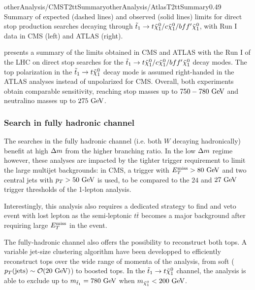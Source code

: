                      {otherAnalysis/CMST2ttSummary}{otherAnalysis/AtlasT2ttSummary}{0.49}
    {Summary of expected (dashed lines) and observed (solid lines) limits for direct stop
    production searches decaying through $\tilde{t}_1 \rightarrow t \tilde{\chi}_1^0 / c \tilde{\chi}_1^0 / b ff' \tilde{\chi}_1^0$,
    with Run I data in CMS (left) and ATLAS (right).}

     presents a summary of the limits obtained in CMS and ATLAS
    with the Run I of the LHC on direct stop searches for the $\tilde{t}_1 \rightarrow t \tilde{\chi}_1^0 / c \tilde{\chi}_1^0 / b ff' \tilde{\chi}_1^0$
    decay modes. The top polarization in the $\tilde{t}_1 \rightarrow t \tilde{\chi}_1^0$ decay mode
    is assumed right-handed in the ATLAS analyses instead of unpolarized for CMS. Overall,
    both experiments obtain comparable sensitivity, reaching stop masses up to $750-780~\text{GeV}$
    and neutralino masses up to $275~\text{GeV}$.

    \subsubsection{Search in fully hadronic channel}

    The searches in the fully hadronic channel (i.e. both $W$ decaying hadronically) \cite{SUS-13-023, ATLASstopSearches}
    benefit at high $\Delta m$ from the higher branching ratio. In the low $\Delta m$ regime however,
    these analyses are impacted by the tighter trigger requirement to limit the large multijet
    backgrounds: in CMS, a trigger with $E_T^\text{miss} > 80~\text{GeV}$ and two central jets with
    $p_T > 50~\text{GeV}$ is used, to be compared to the $24$ and $27~\text{GeV}$ trigger thresholds of
    the 1-lepton analysis.

    Interestingly, this analysis also requires a dedicated strategy to find and veto
    event with lost lepton as the semi-leptonic $t\bar{t}$ becomes a major background
    after requiring large $E_T^\text{miss}$ in the event.

    The fully-hadronic channel also offers the possibility to reconstruct both tops. A
    variable jet-size clustering algorithm have been developped to efficiently reconstruct
    tops over the wide range of momenta of the analysis, from soft ($p_T(\text{jets}) \sim
    \mathcal{O}(20~\text{GeV})$) to boosted tops.
    In the $\tilde{t}_1 \rightarrow t \tilde{\chi}_1^0$ channel, the analysis is able to exclude
    up to $m_{\tilde{t}_1} = 780~\text{GeV}$ when $m_{\tilde{\chi}_1^0} < 200~\text{GeV}$.

